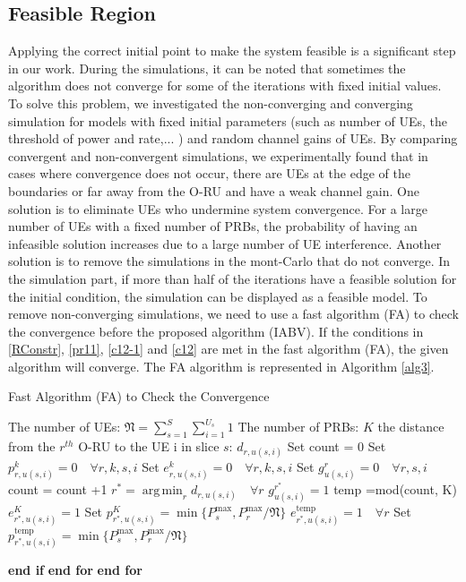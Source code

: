 \documentclass[conference]{IEEEtran}
\DeclareMathOperator*{\argmin}{arg\,min}
\begin{document}
\subsection{Feasible Region}\label{fr}
Applying the correct initial point to make the system feasible is a significant step in our work.
During the simulations, it can be noted that sometimes the algorithm does not converge for some of the iterations with fixed initial values.
To solve this problem, we investigated the non-converging and converging simulation for models with fixed initial parameters (such as number of UEs, the threshold of power and rate,... ) and random channel gains of UEs.
By comparing convergent and non-convergent simulations, we experimentally found that in cases where convergence does not occur, there are UEs at the edge of the boundaries or far away from the O-RU and have a weak channel gain. One solution is to eliminate UEs who undermine system convergence.
For a large number of UEs with a fixed number of PRBs, the probability of having an infeasible solution increases due to a large number of UE interference.
Another solution is to remove the simulations in the mont-Carlo that do not converge.
In the simulation part, if more than half of the iterations have a feasible solution for the initial condition, the simulation can be displayed as a feasible model.
To remove non-converging simulations, we need to use a fast algorithm (FA) to check the convergence before
the proposed algorithm (IABV). 
If the conditions in \eqref{RConstr}, \eqref{pr11}, \eqref{c12-1} and \eqref{c12} are met in the fast algorithm (FA), the given algorithm will converge.
The FA algorithm is represented in Algorithm \ref{alg3}.

 \begin{algorithm}
\caption{Fast Algorithm (FA) to Check the Convergence}\label{alg3}
\begin{algorithmic}[1]
\State The number of UEs: $\mathfrak{N} = \sum_{s=1}^{S}\sum_{i=1}^{U_s}1$
\State The number of PRBs: $K$
\State the distance from the $r^{th}$ O-RU to the UE i in slice $s$: $d_{r,u(s,i)}$ 
\State Set count = 0 
\State Set $p_{r,u(s,i)}^{k} = 0 \quad \forall r,k,s,i$
\State Set $e_{r,u(s,i)}^{k} = 0 \quad \forall r,k,s,i$
\State Set $g_{u(s,i)}^{r} = 0 \quad \forall r,s,i$
\State count = count +1  
\State $r^* = \argmin_r d_{r,u(s,i)} \quad \forall r$
\State $g_{u(s,i)} ^{r^*}=1$
\State temp =mod(count, K)            
\State $e_{r^*,u(s,i)}^{K} = 1 $
\State Set $p_{r^*,u(s,i)}^{K} = \min\{P_s^{\max}, P_r^{\max}/\mathfrak{N}\} $
\Else 
\State $e_{r^*,u(s,i)}^{\text{temp}} = 1 \quad \forall r$ 
\State Set $p_{r^*,u(s,i)}^{\text{temp}} = \min\{P_s^{\max}, P_r^{\max}/\mathfrak{N}\} $
\EndIf

\State \textbf{end if}
\EndFor
\State \textbf{end for}
\EndFor
\State \textbf{end for}
\end{algorithmic}
\end{algorithm}
\end{document}
